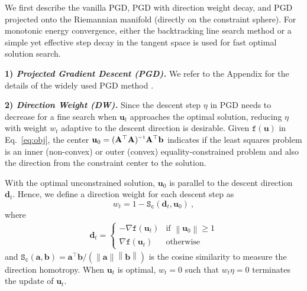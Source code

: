\documentclass{article}
\newcommand{\mb}[1]{\mathbf{#1}}
\newcommand{\inv}{^{\raisebox{.2ex}{$\scriptscriptstyle-1$}}}
\newcommand\norm[1]{\left\lVert#1\right\rVert}
\theoremstyle{plain}
\theoremstyle{definition}
\theoremstyle{remark}
\begin{document}
We first describe the vanilla PGD, PGD with direction weight decay, and PGD projected onto the Riemannian manifold (directly on the constraint sphere).
For monotonic energy convergence, either the backtracking line search method or a simple yet effective step decay in the tangent space is used for fast optimal solution search.

\textbf{1) \textit{Projected Gradient Descent (PGD).}}
We refer to the Appendix for the details of the widely used PGD method \cite{pgd_1,pgd_2}.

\textbf{2) \textit{Direction Weight (DW).}}
Since the descent step $\eta$ in PGD needs to decrease for a fine search when $\mb{u}_t$ approaches the optimal solution, reducing $\eta$ with weight $w_t$ adaptive to the descent direction is desirable.
%
Given $\texttt{f}(\mb{u})$ in Eq.~\eqref{eq:obj}, the center $\mb{u}_0=(\mb{A}^\top\mb{A})\inv\mb{A}^\top\mb{b}$ indicates if the least squares problem is an inner (non-convex) or outer (convex) equality-constrained problem and also the direction from the constraint center to the solution.

With the optimal unconstrained solution, $\mb{u}_0$ is parallel to the descent direction $\mb{d}_t$.
Hence, we define a direction weight for each descent step as
%
\begin{equation}
\label{eq:dir_weight}
w_t = 1 - \texttt{S}_\texttt{c}(\mb{d}_t, \mb{u}_0)\ ,
\end{equation}
%
where
%
\begin{equation}
\label{eq:dir_weight_dir}
\begin{aligned}
\mb{d}_t=
\begin{cases}
    -\nabla \texttt{f}(\mb{u}_t) & \text{if $\norm{ \mb{u}_0 } \geq 1$} \\
     \nabla \texttt{f}(\mb{u}_t) & \text{otherwise}
\end{cases}
\end{aligned}
\end{equation}
and $\texttt{S}_\texttt{c}(\mb{a},\mb{b})=\mb{a}^\top \mb{b}/\left(\norm{ \mb{a} } \norm{ \mb{b} }\right)$ is the cosine similarity to measure the direction homotropy.
When $\mb{u}_t$ is optimal, $w_t=0$ such that $w_t \eta=0$ terminates the update of $\mb{u}_t$.
\end{document}
